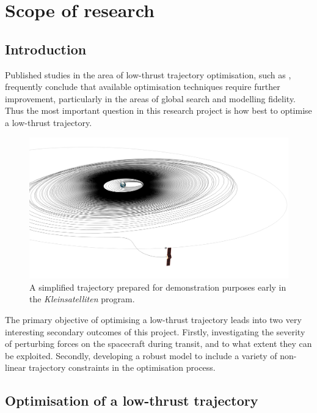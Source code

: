\chapter{Scope of research} \label{cha:Objectives}

\section{Introduction} \label{cha:Research-questions}
Published studies in the area of low-thrust trajectory optimisation, such as \textcite{Petropoulos2007}, frequently conclude that available optimisation techniques require further improvement, particularly in the areas of global search and modelling fidelity. Thus the most important question in this research project is how best to optimise a low-thrust trajectory. 

\begin{figure}
\centering
\includegraphics[width=\textwidth]{Images/BW1_Transfer.png}
\caption{A simplified trajectory prepared  for demonstration purposes early in the \emph{Kleinsatelliten} program.} \label{fig:Early-trajectory}
\end{figure}

The primary objective of optimising a low-thrust trajectory leads into two very interesting secondary outcomes of this project. Firstly, investigating the severity of perturbing forces on the spacecraft during transit, and to what extent they can be exploited. Secondly, developing a robust model to include a variety of non-linear trajectory constraints in the optimisation process.

\section{Optimisation of a low-thrust trajectory} \label{sec:Optimisation-objective}

